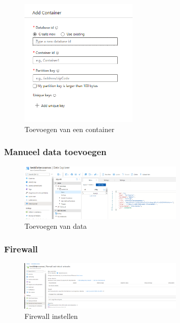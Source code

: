 \documentclass{article}
\begin{document}
\begin{figure}[H]
    \centering
    \includegraphics[width=0.5\textwidth]{cosmosdb-addcontainer.png}
    \caption{Toevoegen van een container}
\end{figure}

\subsubsection{Manueel data toevoegen}

\begin{figure}[H]
    \centering
    \includegraphics[width=0.7\textwidth]{cosmosdb-adddata.png}
    \caption{Toevoegen van data}
\end{figure}

\subsubsection{Firewall}

\begin{figure}[H]
    \centering
    \includegraphics[width=0.7\textwidth]{cosmosdb-firewall.png}
    \caption{Firewall instellen}
\end{figure}
\end{document}

